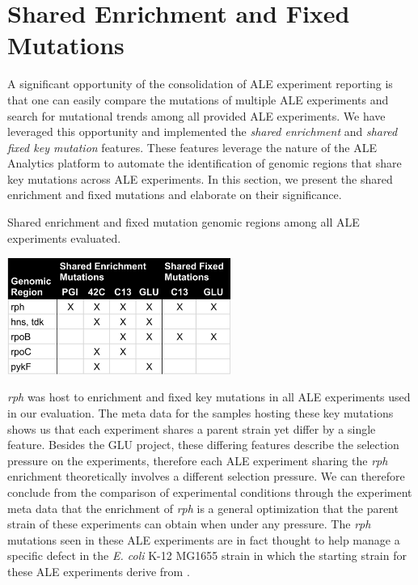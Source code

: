 \documentclass[12pt,final,masters,chapterheads]{ucsd}  %
\begin{document}
\section{Shared Enrichment and Fixed Mutations}
A significant opportunity of the consolidation of ALE experiment reporting is that one can easily compare the mutations of multiple ALE experiments and search for mutational trends among all provided ALE experiments. We have leveraged this opportunity and implemented the \textit{shared enrichment} and \textit{shared fixed key mutation} features. These features leverage the nature of the ALE Analytics platform to automate the identification of genomic regions that share key mutations across ALE experiments. In this section, we present the shared enrichment and fixed mutations and elaborate on their significance.%
\begin{table}[H]
  \centering
  \caption{Shared enrichment and fixed mutation genomic regions among all ALE experiments evaluated.}
  \includegraphics[width=0.55\textwidth]{shared_enrichment_fixed_genomic_regions.png}
\end{table}
\textit{rph} was host to enrichment and fixed key mutations in all ALE experiments used in our evaluation. The meta data for the samples hosting these key mutations shows us that each experiment shares a parent strain yet differ by a single feature. Besides the GLU project, these differing features describe the selection pressure on the experiments, therefore each ALE experiment sharing the \textit{rph} enrichment theoretically involves a different selection pressure. We can therefore conclude from the comparison of experimental conditions through the experiment meta data that the enrichment of \textit{rph} is a general optimization that the parent strain of these experiments can obtain when under any pressure. The \textit{rph} mutations seen in these ALE experiments are in fact thought to help manage a specific defect in the \textit{E. coli} K-12 MG1655 strain in which the starting strain for these ALE experiments derive from \cite{Conrad2009}.
\end{document}

